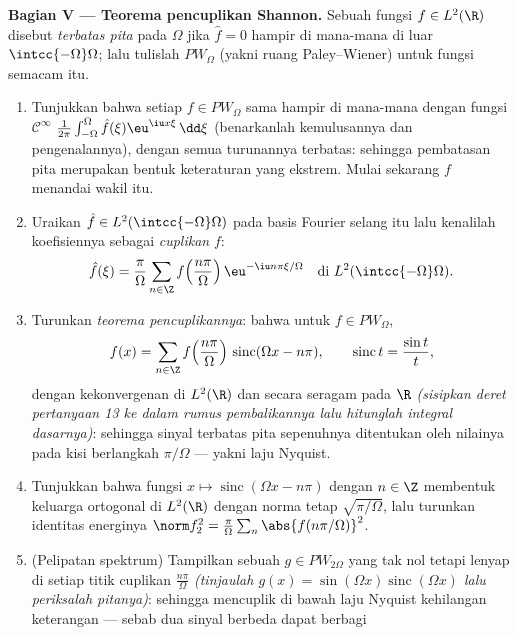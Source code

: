 \begin{problem}[{Soal akhir pekan --- $\partial_tu =
\partial^2_{xx}u$, yang diselesaikan sampai tuntas}]
\medskip
\noindent\textbf{Bagian V --- Teorema pencuplikan Shannon.} Sebuah
fungsi $f \in L^2(\R)$ disebut \emph{terbatas pita} pada $\Omega$
jika $\hat f = 0$ hampir di mana-mana di luar $\intcc{-\Omega}\Omega$; lalu tulislah
$PW_\Omega$ (yakni ruang Paley--Wiener) untuk fungsi semacam itu.
\begin{enumerate}[resume]
  \item Tunjukkan bahwa setiap $f \in PW_\Omega$ sama hampir di mana-mana dengan
        fungsi $\mathcal C^\infty$
        $\frac1{2\pi}\int_{-\Omega}^{\Omega}\hat
        f(\xi)\eu^{\iu x\xi}\,\dd\xi$ (benarkanlah kemulusannya dan
        pengenalannya), dengan semua turunannya terbatas:
        sehingga pembatasan pita merupakan bentuk keteraturan yang ekstrem.
        Mulai sekarang $f$ menandai wakil itu.
  \item Uraikan $\hat f \in L^2(\intcc{-\Omega}\Omega)$ pada
        basis Fourier selang itu lalu kenalilah
        koefisiennya sebagai \emph{cuplikan} $f$:
        \[
        \hat f(\xi) = \frac\pi\Omega\sum_{n\in\Z}
        f\Bigl(\frac{n\pi}\Omega\Bigr)\,
        \eu^{-\iu n\pi\xi/\Omega}
        \quad\text{di } L^2(\intcc{-\Omega}\Omega) .
        \]
  \item Turunkan \emph{teorema pencuplikannya}: bahwa untuk $f \in
        PW_\Omega$,
        \[
        f(x) = \sum_{n\in\Z}f\Bigl(\frac{n\pi}
        \Omega\Bigr)\,\operatorname{sinc}(\Omega x - n\pi),
        \qquad \operatorname{sinc}t = \frac{\sin t}t,
        \]
        dengan kekonvergenan di $L^2(\R)$ dan secara seragam pada $\R$
        \emph{(sisipkan deret pertanyaan 13 ke dalam
        rumus pembalikannya lalu hitunglah integral
        dasarnya)}: sehingga sinyal terbatas pita sepenuhnya
        ditentukan oleh nilainya pada kisi berlangkah
        $\pi/\Omega$ --- yakni laju Nyquist.
  \item Tunjukkan bahwa fungsi $x \mapsto
        \operatorname{sinc}(\Omega x - n\pi)$ dengan $n \in \Z$
        membentuk keluarga ortogonal di $L^2(\R)$ dengan norma
        tetap $\sqrt{\pi/\Omega}$, lalu turunkan identitas
        energinya $\norm f_2^2 =
        \frac\pi\Omega\sum_n\abs{f(n\pi/\Omega)}^2$.
  \item (Pelipatan spektrum) Tampilkan sebuah $g \in PW_{2\Omega}$ yang tak nol
        tetapi lenyap di setiap titik cuplikan $\frac{n\pi}\Omega$
        \emph{(tinjaulah $g(x) =
        \sin(\Omega x)\operatorname{sinc}(\Omega x)$ lalu
        periksalah pitanya)}: sehingga mencuplik di bawah laju Nyquist
        kehilangan keterangan --- sebab dua sinyal berbeda dapat berbagi

\end{enumerate}
\end{problem}
